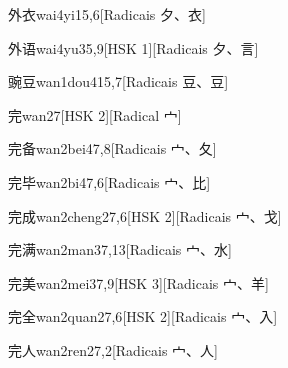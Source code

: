 \begin{entry}{外衣}{wai4yi1}{5,6}[Radicais ⼣、⾐]
\end{entry}

\begin{entry}{外语}{wai4yu3}{5,9}[HSK 1][Radicais ⼣、⾔]
\end{entry}

\begin{entry}{豌豆}{wan1dou4}{15,7}[Radicais ⾖、⾖]
\end{entry}

\begin{entry}{完}{wan2}{7}[HSK 2][Radical ⼧]
\end{entry}

\begin{entry}{完备}{wan2bei4}{7,8}[Radicais ⼧、⼡]
\end{entry}

\begin{entry}{完毕}{wan2bi4}{7,6}[Radicais ⼧、⽐]
\end{entry}

\begin{entry}{完成}{wan2cheng2}{7,6}[HSK 2][Radicais ⼧、⼽]
\end{entry}

\begin{entry}{完满}{wan2man3}{7,13}[Radicais ⼧、⽔]
\end{entry}

\begin{entry}{完美}{wan2mei3}{7,9}[HSK 3][Radicais ⼧、⽺]
\end{entry}

\begin{entry}{完全}{wan2quan2}{7,6}[HSK 2][Radicais ⼧、⼊]
\end{entry}

\begin{entry}{完人}{wan2ren2}{7,2}[Radicais ⼧、⼈]
\end{entry}

